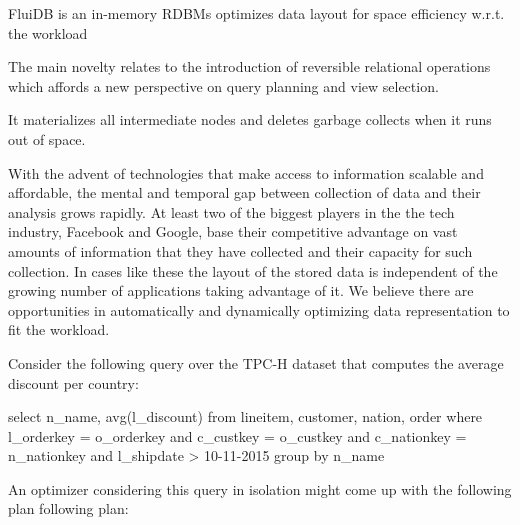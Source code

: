 \begin{summary}
\item FluiDB is an in-memory RDBMs optimizes data layout for space efficiency w.r.t. the workload
\item The main novelty relates to the introduction of reversible relational operations which affords a new
  perspective on query planning and view selection.
\item It materializes all intermediate nodes and deletes garbage collects when it runs out of space.
\end{summary}

With the advent of technologies that make access to information
scalable and affordable, the mental and temporal gap between
collection of data and their analysis grows rapidly. At least two of
the biggest players in the the tech industry, Facebook and Google,
base their competitive advantage on vast amounts of information that
they have collected and their capacity for such collection. In cases
like these the layout of the stored data is independent of the growing
number of applications taking advantage of it. We believe there are
opportunities in automatically and dynamically optimizing data
representation to fit the workload.

Consider the following query over the TPC-H dataset that computes the average discount per country:

\begin{code}
  \begin{sqlcode}
    select      n_name, avg(l_discount)
    from        lineitem, customer, nation, order
    where       l_orderkey = o_orderkey
    and         c_custkey = o_custkey
    and         c_nationkey = n_nationkey
    and         l_shipdate > 10-11-2015
    group by    n_name
  \end{sqlcode}
\end{code}

An optimizer considering this query in isolation might come up with
the following plan following plan:

